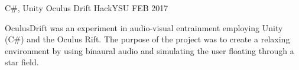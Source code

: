 
\begin{cventries}
			
	\cventry
	{{\color{awesome} C\#, Unity}} %
	{Oculus Drift} %
	{HackYSU} %
	{FEB 2017} %
	{
		\begin{cvitems} %
			\item {OculusDrift was an experiment in audio-visual entrainment employing Unity (C\#) and the Oculus 
				Rift. The purpose of the project was to create a relaxing environment by using binaural audio and
				simulating the user floating through a star field.}
		\end{cvitems}
	}
			
\end{cventries}